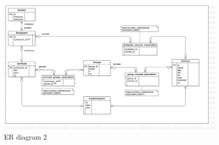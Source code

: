 \documentclass{article}
\begin{document}
\begin{figure}[!h]
  \begin{center}
   \includegraphics[width=\textwidth]{img/ERDdiagram.png}
     \caption{ER diagram 2}
  \label{fig: Entity Relationship diagram 2}
  \end{center}
\end{figure}
\newpage
\end{document}
